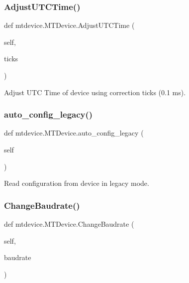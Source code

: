 \subsubsection{\texorpdfstring{Adjust\+U\+T\+C\+Time()}{AdjustUTCTime()}}
{\footnotesize\ttfamily def mtdevice.\+M\+T\+Device.\+Adjust\+U\+T\+C\+Time (\begin{DoxyParamCaption}\item[{}]{self,  }\item[{}]{ticks }\end{DoxyParamCaption})}

\begin{DoxyVerb}Adjust UTC Time of device using correction ticks (0.1 ms).\end{DoxyVerb}
 \mbox{\label{classmtdevice_1_1MTDevice_a2f6e1f0e3ca9c5459b97dc1007050c7b}} 
\subsubsection{\texorpdfstring{auto\+\_\+config\+\_\+legacy()}{auto\_config\_legacy()}}
{\footnotesize\ttfamily def mtdevice.\+M\+T\+Device.\+auto\+\_\+config\+\_\+legacy (\begin{DoxyParamCaption}\item[{}]{self }\end{DoxyParamCaption})}

\begin{DoxyVerb}Read configuration from device in legacy mode.\end{DoxyVerb}
 \mbox{\label{classmtdevice_1_1MTDevice_a065580ecd5e3906b8f49c46c1b1510e7}} 
\subsubsection{\texorpdfstring{Change\+Baudrate()}{ChangeBaudrate()}}
{\footnotesize\ttfamily def mtdevice.\+M\+T\+Device.\+Change\+Baudrate (\begin{DoxyParamCaption}\item[{}]{self,  }\item[{}]{baudrate }\end{DoxyParamCaption})}

